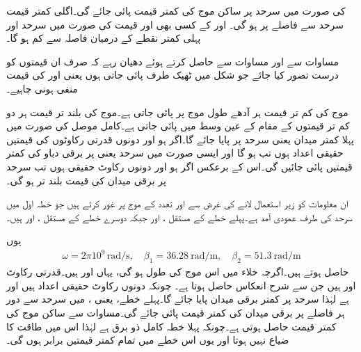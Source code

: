  کی صورت میں سرحد پر ساکن موج کی کمتر قیمت پائی جائے گی۔اگلی کمتر قیمت سرحد سے  فاصلے پر ہو گی۔ اور  کے کسی بھی اور قیمت کی صورت میں سرحد اور پہلی کمتر نقطے کے درمیان فاصلہ  سے کم ہو گا۔

مساوات  سے  اور مساوات  سے  حاصل کرتے ہوئے دھیان رہے کہ صرف ان قیمتوں کو درست تصور کیا جائے جو شکل  میں ٹھیک طرف پائی جاتی ہوں یعنی  اور   کی قیمت منفی ہونی چاہیے۔

موج کی کم تر قیمت ہر آدھے طول موج پر پائی جاتی ہے۔موج کی بلند تر قیمت ہر دو کم تر قیمتوں کے مقام کے عین وسط میں پائی جاتی ہے۔کامل موصل کی صورت میں پہلا کمتر میدان  یعنی سرحد پر پایا جائے گا۔اگر  ہو اور دونوں قدرتی رکاوٹوں کی قیمتیں حقیقی اعداد ہوں تب  ہو گا اور ایسی صورت میں سرحد یعنی  پر برقی دباو کی کمتر قیمتیں پائی جائیں گی۔اس کے برعکس اگر  ہو اور دونوں رکاوٹ حقیقی ہوں تب سرحد پر برقی میدان کی قیمت بلند تر ہو گی۔  

ان معلومات کو زیر استعمال لانے کی غرض سے  اور  تعدد کے موج پر غور کرتے ہیں جو خطہ اول میں سرحد کی طرف عمودی آمد ہے۔پہلے خطے کے مستقل ،  اور  جبکہ دوسرے خطے کے مستقل
 ،  اور  ہیں۔

یوں 
\begin{align*}
\omega=2 \pi 10^9 \, \si{\radian \per \second}, \quad \beta_1=\SI{36.28}{\radian \per \meter}, \quad \beta_2=\SI{51.3}{\radian \per \meter}
\end{align*}
حاصل ہوتے ہیں۔اگرچہ خلاء میں اس موج کی طول  ہو گی، یہاں   اور  ہیں۔قدرتی رکاوٹ  اور  ہیں جن سے شرح انعکاس  حاصل ہوتا ہے۔ چونکہ دونوں رکاوٹ حقیقی اعداد ہیں اور  ہے لہٰذا سرحد پر کمتر برقی میدان پایا جائے گا۔پہلے خطے، یعنی  ،  میں سرحد سے دور ہر  فاصلے پر برقی میدان کی کمتر قیمت پائی جائے گی۔مساوات  سے ساکن موج کی کمتر قیمت  حاصل ہوتی ہے۔چونکہ پہلا خطہ کامل ذو برق ہے لہٰذا اس میں طاقت کا ضیاع نہیں ہوتا اور یوں اس خطے میں تمام کمتر قیمتیں برابر ہوں گی۔

